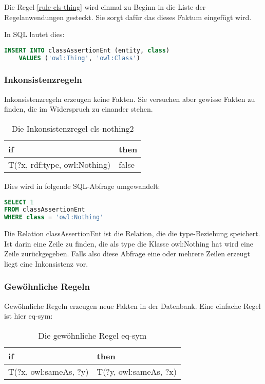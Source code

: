 Die Regel \ref{rule-cls-thing} wird einmal zu Beginn in die Liste der Regelanwendungen gesteckt. Sie sorgt dafür das dieses Faktum eingefügt wird.

In SQL lautet dies:
\begin{lstlisting}[language=SQL]
INSERT INTO classAssertionEnt (entity, class)
	VALUES ('owl:Thing', 'owl:Class')
\end{lstlisting}

\subsubsection{Inkonsistenzregeln}
Inkonsistenzregeln erzeugen keine Fakten. Sie versuchen aber gewisse Fakten zu finden, die im Widerspruch zu einander stehen.

\begin{table}[htb]
\begin{center}
	\begin{tabular}{l|l}
	if & then \\ \hline
	T(?x, rdf:type, owl:Nothing) & false
	\end{tabular}
\end{center}
	\caption{Die Inkonsistenzregel cls-nothing2}
	\label{rule-cls-nothing2}
\end{table}


Dies wird in folgende SQL-Abfrage umgewandelt:
\begin{lstlisting}[language=SQL]
SELECT 1
FROM classAssertionEnt
WHERE class = 'owl:Nothing'
\end{lstlisting}

Die Relation classAssertionEnt ist die Relation, die die type-Beziehung speichert. Ist darin eine Zeile zu finden, die als type die Klasse owl:Nothing hat wird eine Zeile zurückgegeben. Falls also diese Abfrage eine oder mehrere Zeilen erzeugt liegt eine Inkonsistenz vor.

\subsubsection{Gewöhnliche Regeln}
Gewöhnliche Regeln erzeugen neue Fakten in der Datenbank. Eine einfache Regel ist hier eq-sym:

\begin{table}[htb]
\begin{center}
	\begin{tabular}{l|l}
	if & then \\ \hline
	T(?x, owl:sameAs, ?y) & T(?y, owl:sameAs, ?x)
	\end{tabular}
\end{center}
	\caption{Die gewöhnliche Regel eq-sym}
	\label{rule-eq-sym}
\end{table}

